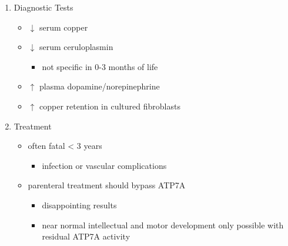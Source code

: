 \documentclass{scrartcl}
\begin{document}
\begin{enumerate}
\item Diagnostic Tests
\label{sec:org591d5f8}
\begin{itemize}
\item \(\downarrow\) serum copper
\item \(\downarrow\) serum ceruloplasmin 
\begin{itemize}
\item not specific in 0-3 months of life
\end{itemize}
\item \(\uparrow\) plasma dopamine/norepinephrine
\item \(\uparrow\) copper retention in cultured fibroblasts
\end{itemize}

\item Treatment
\label{sec:org4b676e8}
\begin{itemize}
\item often fatal < 3 years
\begin{itemize}
\item infection or vascular complications
\end{itemize}
\item parenteral treatment should bypass ATP7A
\begin{itemize}
\item disappointing results
\item near normal intellectual and motor development only possible with
residual ATP7A activity
\end{itemize}
\end{itemize}
\end{enumerate}
\end{document}
